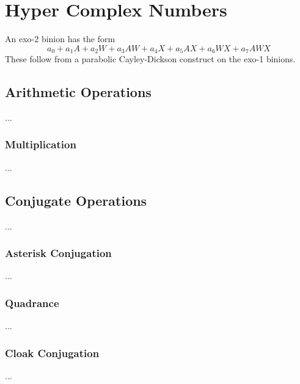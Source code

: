 \chapter{Hyper Complex Numbers}
An exo-2 binion has the form
\begin{equation}
    a_{0} + a_{1} A + a_{2} W + a_{3} AW + a_{4} X + a_{5} AX + a_{6} WX + a_{7} AWX
\end{equation}
These follow from a parabolic Cayley-Dickson construct on the exo-1 binions.
\section{Arithmetic Operations}
...
\subsection{Multiplication}
...
\section{Conjugate Operations}
...
\subsection{Asterisk Conjugation}
...
\subsection{Quadrance}
...
\subsection{Cloak Conjugation}
...
